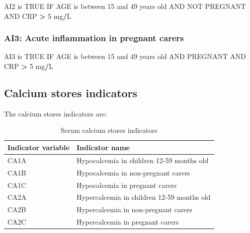 \documentclass[12pt,a4paper]{article}
\newenvironment{Shaded}{\begin{snugshade}}{\end{snugshade}}
\newcommand{\DecValTok}[1]{\textcolor[rgb]{0.00,0.00,0.81}{#1}}
\newcommand{\NormalTok}[1]{#1}
\newcommand{\OperatorTok}[1]{\textcolor[rgb]{0.81,0.36,0.00}{\textbf{#1}}}
\newcommand{\OtherTok}[1]{\textcolor[rgb]{0.56,0.35,0.01}{#1}}
\newcommand{\StringTok}[1]{\textcolor[rgb]{0.31,0.60,0.02}{#1}}
\begin{document}
\begin{Shaded}
\begin{Highlighting}[]
\NormalTok{AI2 is }\OtherTok{TRUE}\NormalTok{ IF AGE is between }\DecValTok{15}\NormalTok{ and }\DecValTok{49}\NormalTok{ years old AND }
\NormalTok{  NOT PREGNANT AND CRP }\OperatorTok{>}\StringTok{ }\DecValTok{5}\NormalTok{ mg}\OperatorTok{/}\NormalTok{L}
\end{Highlighting}
\end{Shaded}

\hypertarget{ai3-acute-inflammation-in-pregnant-carers}{%
\subsubsection{AI3: Acute inflammation in pregnant carers}\label{ai3-acute-inflammation-in-pregnant-carers}}

\begin{Shaded}
\begin{Highlighting}[]
\NormalTok{AI3 is }\OtherTok{TRUE}\NormalTok{ IF AGE is between }\DecValTok{15}\NormalTok{ and }\DecValTok{49}\NormalTok{ years old AND }
\NormalTok{  PREGNANT AND CRP }\OperatorTok{>}\StringTok{ }\DecValTok{5}\NormalTok{ mg}\OperatorTok{/}\NormalTok{L}
\end{Highlighting}
\end{Shaded}

\hypertarget{calcium-stores-indicators}{%
\subsection{Calcium stores indicators}\label{calcium-stores-indicators}}

The calcium stores indicators are:

\begin{table}[H]

\caption{\label{tab:cal1}Serum calcium stores indicators}
\centering
\begin{tabular}[t]{ll}
\toprule
\textbf{Indicator variable} & \textbf{Indicator name}\\
\midrule
\rowcolor{gray!6}  CA1A & Hypocalcemia in children 12-59 months old\\
CA1B & Hypocalcemia in non-pregnant carers\\
\rowcolor{gray!6}  CA1C & Hypocalcemia in pregnant carers\\
CA2A & Hypercalcemia in children 12-59 months old\\
\rowcolor{gray!6}  CA2B & Hypercalcemia in non-pregnant carers\\
\addlinespace
CA2C & Hypercalcemia in pregnant carers\\
\bottomrule
\end{tabular}
\end{table}
\end{document}
